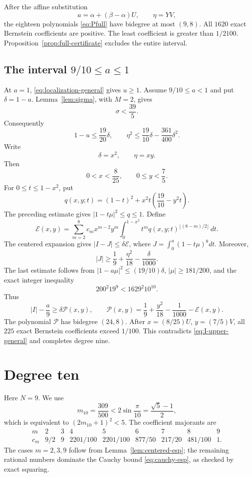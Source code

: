 \documentclass[11pt]{article}
\theoremstyle{remark}
\begin{document}
After the affine substitution
\[
 a=\alpha+(\beta-\alpha)U,
 \qquad
 \eta=YV,
\]
the eighteen polynomials \eqref{eq:Pfull} have bidegree at most $(9,8)$.
All $1620$ exact Bernstein coefficients are positive.  The least coefficient
is greater than $1/2100$.  Proposition~\ref{prop:full-certificate} excludes
the entire interval.

\subsection{The interval $9/10\le a\le1$}

At $a=1$, \eqref{eq:localization-general} gives $u\ge1$.  Assume
$9/10\le a<1$ and put $\delta=1-a$.  Lemma~\ref{lem:sigma}, with $M=2$,
gives
\[
 \sigma<\frac{39}{5}.
\]
Consequently
\[
 1-u\le\frac{19}{20}\delta,
 \qquad
 \eta^2\le\frac{19}{10}\delta-\frac{361}{400}\delta^2.
\]
Write
\[
 \delta=x^2,
 \qquad
 \eta=xy.
\]
Then
\[
 0<x<\frac8{25},
 \qquad
 0\le y<\frac75.
\]
For $0\le t\le1-x^2$, put
\[
 q(x,y;t)=(1-t)^2+x^2t\left(\frac{19}{10}-y^2t\right).
\]
The preceding estimate gives $|1-t\mu|^2\le q\le1$.  Define
\[
 \mathcal E(x,y)=
 \sum_{m=2}^8c_mx^{m-2}y^m
 \int_0^{1-x^2}t^m q(x,y;t)^{\lfloor(8-m)/2\rfloor}\,dt.
\]
The centered expansion gives $|I-J|\le\delta\mathcal E$, where
$J=\int_0^a(1-t\mu)^8dt$.  Moreover,
\[
 |J|\ge\frac19+\frac{\eta^2}{18}-\frac\delta{1000}.
\]
The last estimate follows from
$|1-a\mu|^2\le(19/10)\delta$, $|\mu|\ge181/200$, and the exact integer
inequality
\[
 200^2 19^9<1629^2 10^{10}.
\]
Thus
\[
 |I|-\frac a9\ge\delta\mathcal P(x,y),
 \qquad
 \mathcal P(x,y)=\frac19+\frac{y^2}{18}-\frac1{1000}-\mathcal E(x,y).
\]
The polynomial $\mathcal P$ has bidegree $(24,8)$.  After
$x=(8/25)U$, $y=(7/5)V$, all $225$ exact Bernstein coefficients exceed
$1/100$.  This contradicts \eqref{eq:I-upper-general} and completes degree
nine.

\section{Degree ten}

Here $N=9$.  We use
\[
 m_{10}=\frac{309}{500}<2\sin\frac\pi{10}
 =\frac{\sqrt5-1}{2},
\]
which is equivalent to $(2m_{10}+1)^2<5$.  The coefficient majorants are
\begin{equation}\label{eq:c10}
\begin{array}{c|cccccccc}
 m&2&3&4&5&6&7&8&9\\ \hline
 c_m&9/2&9&2201/100&2201/100&877/50&217/20&481/100&1.
\end{array}
\end{equation}
The cases $m=2,3,9$ follow from Lemma~\ref{lem:centered-esp}; the remaining
rational numbers dominate the Cauchy bound \eqref{eq:cauchy-esp}, as checked by exact
squaring.
\end{document}
